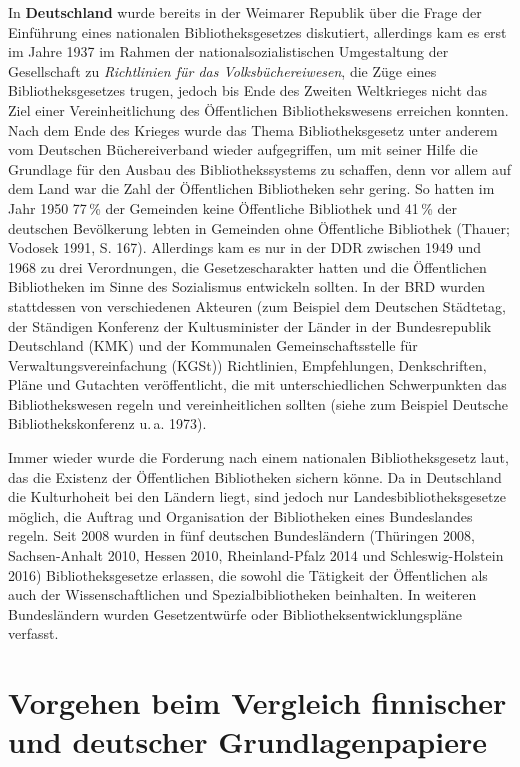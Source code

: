 \documentclass[a4paper,
fontsize=11pt,
oneside,
numbers=noperiodatend,
parskip=half-,
bibliography=totoc,
final
]{scrartcl}
\begin{document}
In \textbf{Deutschland} wurde bereits in der Weimarer Republik über die
Frage der Einführung eines nationalen Bibliotheksgesetzes diskutiert,
allerdings kam es erst im Jahre 1937 im Rahmen der
nationalsozialistischen Umgestaltung der Gesellschaft zu
\emph{Richtlinien für das Volksbüchereiwesen}, die Züge eines
Bibliotheksgesetzes trugen, jedoch bis Ende des Zweiten Weltkrieges
nicht das Ziel einer Vereinheitlichung des Öffentlichen
Bibliothekswesens erreichen konnten. Nach dem Ende des Krieges wurde das
Thema Bibliotheksgesetz unter anderem vom Deutschen Büchereiverband
wieder aufgegriffen, um mit seiner Hilfe die Grundlage für den Ausbau
des Bibliothekssystems zu schaffen, denn vor allem auf dem Land war die
Zahl der Öffentlichen Bibliotheken sehr gering. So hatten im Jahr 1950
77\,\% der Gemeinden keine Öffentliche Bibliothek und 41\,\% der
deutschen Bevölkerung lebten in Gemeinden ohne Öffentliche Bibliothek
(Thauer; Vodosek 1991, S. 167). Allerdings kam es nur in der DDR
zwischen 1949 und 1968 zu drei Verordnungen, die Gesetzescharakter
hatten und die Öffentlichen Bibliotheken im Sinne des Sozialismus
entwickeln sollten. In der BRD wurden stattdessen von verschiedenen
Akteuren (zum Beispiel dem Deutschen Städtetag, der Ständigen Konferenz
der Kultusminister der Länder in der Bundesrepublik Deutschland (KMK)
und der Kommunalen Gemeinschaftsstelle für Verwaltungsvereinfachung
(KGSt)) Richtlinien, Empfehlungen, Denkschriften, Pläne und Gutachten
veröffentlicht, die mit unterschiedlichen Schwerpunkten das
Bibliothekswesen regeln und vereinheitlichen sollten (siehe zum Beispiel
Deutsche Bibliothekskonferenz u.\,a. 1973).

Immer wieder wurde die Forderung nach einem nationalen Bibliotheksgesetz
laut, das die Existenz der Öffentlichen Bibliotheken sichern könne. Da
in Deutschland die Kulturhoheit bei den Ländern liegt, sind jedoch nur
Landesbibliotheksgesetze möglich, die Auftrag und Organisation der
Bibliotheken eines Bundeslandes regeln. Seit 2008 wurden in fünf
deutschen Bundesländern (Thüringen 2008, Sachsen-Anhalt 2010, Hessen
2010, Rheinland-Pfalz 2014 und Schleswig-Holstein 2016)
Bibliotheksgesetze erlassen, die sowohl die Tätigkeit der Öffentlichen
als auch der Wissenschaftlichen und Spezialbibliotheken beinhalten. In
weiteren Bundesländern wurden Gesetzentwürfe oder
Bibliotheksentwicklungspläne verfasst.

\hypertarget{vorgehen-beim-vergleich-finnischer-und-deutscher-grundlagenpapiere}{%
\section{Vorgehen beim Vergleich finnischer und deutscher
Grundlagenpapiere}\label{vorgehen-beim-vergleich-finnischer-und-deutscher-grundlagenpapiere}}
\end{document}
